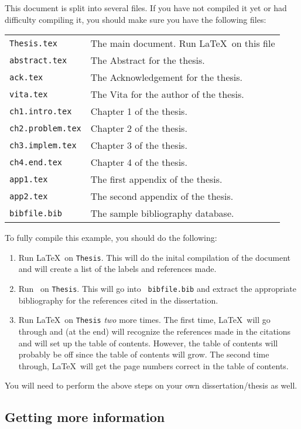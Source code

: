 This document is split into several files.  If you have not compiled
it yet or had difficulty compiling it, you should make sure you have
the following files:
%
\begin{center}
\begin{tabular}{l l}
{\tt Thesis.tex} & The main document. Run \LaTeX\ on this file\\
{\tt abstract.tex} & The Abstract for the thesis.\\
{\tt ack.tex} & The Acknowledgement for the thesis.\\
{\tt vita.tex} & The Vita for the author of the thesis.\\
{\tt ch1.intro.tex} & Chapter 1 of the thesis.\\
{\tt ch2.problem.tex} & Chapter 2 of the thesis.\\
{\tt ch3.implem.tex} & Chapter 3 of the thesis.\\
{\tt ch4.end.tex} & Chapter 4 of the thesis.\\
{\tt app1.tex} & The first appendix of the thesis.\\
{\tt app2.tex} & The second appendix of the thesis.\\
{\tt bibfile.bib} & The sample bibliography database.
\end{tabular}
\end{center}
%

To fully compile this example, you should do the following:
%
\begin{enumerate}
\item Run \LaTeX\ on {\tt Thesis}.  This will do the inital
compilation of the document and will create a list of the labels and
references made.
%
\item Run \BibTeX\ on {\tt Thesis}.  This will go into {\tt
bibfile.bib} and extract the appropriate bibliography for the
references  cited in the dissertation.
%
\item Run \LaTeX\ on {\tt Thesis} {\em two} more times.  
The first time, \LaTeX\ will go through and (at the end) will
recognize the references made in the citations and will set up the
table of contents. However, the table of contents will probably be off
since the table of contents will grow.  The second time through,
\LaTeX\ will get the page numbers correct in the table of contents.
\end{enumerate}
%
You will need to perform the above steps on your own
dissertation/thesis as well.

\subsection{Getting more information}

